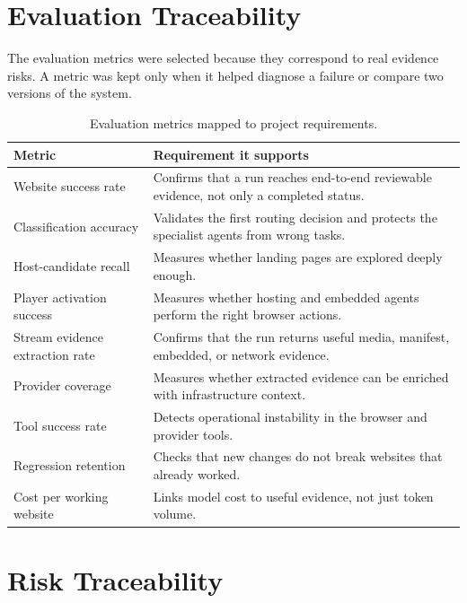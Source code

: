 \section{Evaluation Traceability}

The evaluation metrics were selected because they correspond to real evidence
risks. A metric was kept only when it helped diagnose a failure or compare two
versions of the system.

\begin{table}[!htbp]
\centering
\begin{tabularx}{\textwidth}{Q{4.0cm}Y}
\toprule
{}
Metric & Requirement it supports \\
\midrule
Website success rate & Confirms that a run reaches end-to-end reviewable
evidence, not only a completed status. \\
Classification accuracy & Validates the first routing decision and protects the
specialist agents from wrong tasks. \\
Host-candidate recall & Measures whether landing pages are explored deeply
enough. \\
Player activation success & Measures whether hosting and embedded agents
perform the right browser actions. \\
Stream evidence extraction rate & Confirms that the run returns useful media,
manifest, embedded, or network evidence. \\
Provider coverage & Measures whether extracted evidence can be enriched with
infrastructure context. \\
Tool success rate & Detects operational instability in the browser and provider
tools. \\
Regression retention & Checks that new changes do not break websites that
already worked. \\
Cost per working website & Links model cost to useful evidence, not just token
volume. \\
\bottomrule
\end{tabularx}
\caption{Evaluation metrics mapped to project requirements.}
\label{tab:evaluation-traceability}
\end{table}

\section{Risk Traceability}

